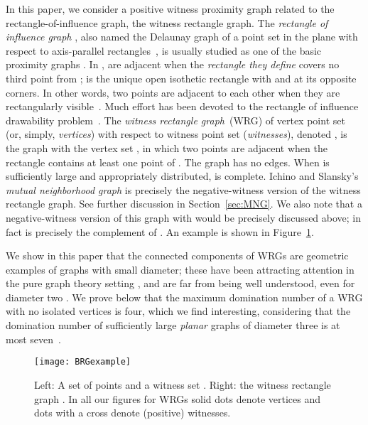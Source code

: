 \documentclass{llncs}
\begin{document}
In this paper, we consider a positive witness proximity
graph related to the rectangle-of-influence graph, the
witness rectangle graph.  The \emph{rectangle of influence graph}
, also named the Delaunay graph of a point set in the plane with respect to axis-parallel rectangles~\cite{Janos}, is usually studied as one of the basic proximity graphs
\cite{LLMW98,Li08}.
In ,  are adjacent when the \emph{rectangle
   they define} covers no third point from ;  is
the unique open isothetic rectangle with  and  at its opposite corners.
In other words, two points are adjacent to each other when they are rectangularly visible~\cite{RectangularVisibility1, RectangularVisibility2, RectangularVisibility3}.
Much effort has been devoted to the rectangle of influence drawability problem~\cite{LLMW98, RectangleDrawability1, RectangleDrawability2, RectangleDrawability3, RectangleDrawability4, RectangleDrawability5, RectangleDrawability6}.
The \emph{witness rectangle graph}~(WRG) of vertex point set  (or,
simply, \emph{vertices}) with respect to witness point set 
(\emph{witnesses}), denoted , is the graph with the vertex
set , in which two points  are adjacent when the
rectangle  contains at least one point of .
The graph  has no edges.  When  is
sufficiently large and appropriately distributed,  is
complete. 
Ichino and Slansky's \cite{MNG} \emph{mutual neighborhood graph} 
is precisely the negative-witness version of the witness rectangle 
graph. See further discussion in Section~\ref{sec:MNG}.
We also note that a
negative-witness version of this graph with  would be precisely
 discussed above;
in fact  is precisely the complement of
.     An example is shown in
Figure~\ref{fig:RGexample}. 

We show in this paper that the connected components of WRGs are geometric examples of graphs with small diameter; these have
  been attracting attention in the pure graph theory setting \cite{SmallDiameter1, SmallDiameter2}, and are far from being
  well understood, even for diameter two \cite{diameterTwo1,diameterTwo2,diameterTwo3}.
  We prove below that the maximum domination number of a WRG with no isolated vertices is four, which we find interesting, considering that the domination number of sufficiently large \emph{planar} graphs of diameter three is at most seven~\cite{Domination, Domination2}.

\begin{figure}[htbp!]
  \centering
  \texttt{[image: BRGexample]}
  \caption{Left: A set of points  and a witness set
    . Right: the witness rectangle graph .  In
    all our figures for WRGs solid dots denote vertices and dots with
    a cross denote (positive) witnesses.  }
  \label{fig:RGexample}
\end{figure}
\end{document}

